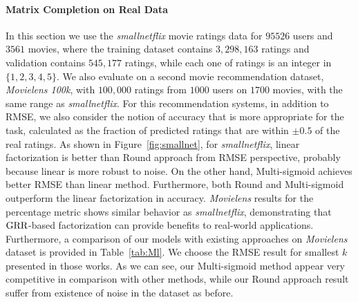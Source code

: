 \documentclass{article}
\begin{document}
\paragraph{Matrix Completion on Real Data}
%
In this section we use the \emph{smallnetflix} movie ratings data for $95526$ users and $3561$ movies, where the training dataset contains $3,298,163$ ratings and validation contains $545,177$ ratings, while each one of ratings is an integer in $\{1,2,3,4,5\}$. %
We also evaluate on a second movie recommendation dataset, \emph{Movielens 100k}, with $100,000$ ratings from $1000$ users on $1700$ movies, with the same range as \emph{smallnetflix}.  
For this recommendation systems, in addition to RMSE, we also consider the notion of accuracy that is more appropriate for the task, calculated as the fraction of predicted ratings that are within $\pm0.5$ of the real ratings. As shown in Figure~\ref{fig:smallnet}, for \emph{smallnetflix}, linear factorization is better than Round approach from RMSE perspective, probably because linear is more robust to noise. On the other hand, Multi-sigmoid achieves better RMSE than linear method. Furthermore, both Round and Multi-sigmoid outperform the linear factorization in accuracy. \emph{Movielens} results for the percentage metric shows similar behavior as \emph{smallnetflix}, demonstrating that $\text{GRR}$-based factorization can provide benefits to real-world applications. Furthermore, a comparison of our models with existing approaches on \emph{Movielens} dataset is provided in Table~\ref{tab:Ml}. We choose the RMSE result for smallest $k$ presented in those works. As we can see, our Multi-sigmoid method appear very competitive in comparison with other methods, while our Round approach result suffer from existence of noise in the dataset as before.   
\end{document}

